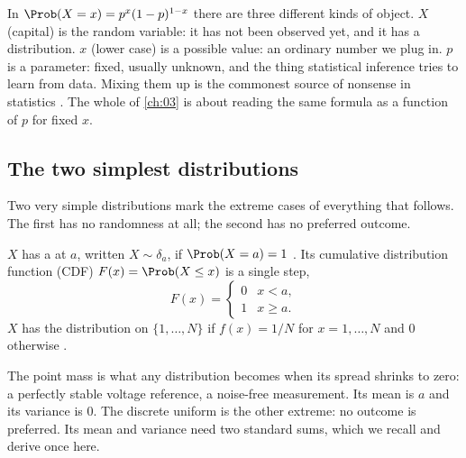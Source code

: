 \begin{pitfall}
In $\Prob(X=x)=p^x(1-p)^{1-x}$ there are three different kinds of object. $X$ (capital) is the random variable: it has not been observed yet, and it has a distribution. $x$ (lower case) is a possible value: an ordinary number we plug in. $p$ is a parameter: fixed, usually unknown, and the thing statistical inference tries to learn from data. Mixing them up is the commonest source of nonsense in statistics . The whole of \cref{ch:03} is about reading the same formula as a function of $p$ for fixed $x$.
\end{pitfall}

\subsection{The two simplest distributions}

Two very simple distributions mark the extreme cases of everything that follows. The first has no randomness at all; the second has no preferred outcome.

\begin{workdef}
$X$ has a  at $a$, written $X\sim\delta_a$, if $\Prob(X=a)=1$ . Its cumulative distribution function (CDF) $F(x)=\Prob(X\le x)$ is a single step,
\[
  F(x)=\begin{cases}0 & x<a,\\ 1 & x\ge a.\end{cases}
\]
$X$ has the  distribution on $\{1,\dots,N\}$ if $f(x)=1/N$ for $x=1,\dots,N$ and $0$ otherwise .
\end{workdef}

The point mass is what any distribution becomes when its spread shrinks to zero: a perfectly stable voltage reference, a noise-free measurement. Its mean is $a$ and its variance is $0$. The discrete uniform is the other extreme: no outcome is preferred. Its mean and variance need two standard sums, which we recall and derive once here.

